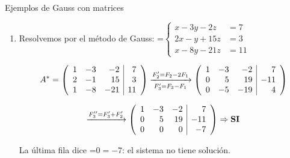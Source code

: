 \documentclass[11pt,a4paper]{article}
\newcommand{\fmm}[1]{\setbox0=\hbox{$#1$}\ifdim\wd0>\linewidth\fmdisp{#1}\else\mbox{\box0}\fi}
\newcommand{\fmdisp}[1]{\[\setbox2=\hbox{$\displaystyle #1$}\ifdim\wd2>\linewidth\resizebox{\linewidth}{!}{\box2}\else\box2\fi\]}
\begin{document}
\begin{fmex}{Ejemplos de Gauss con matrices}
\begin{enumerate}[label=\textbf{\arabic*.},leftmargin=*]
\fmdisp{\xrightarrow{F_3''=-2F_3'+F_2'}\left(\begin{array}{rrr|r}1 & -3 & 7 & 10\\ 0 & 14 & -34 & -42\\ 0 & 0 & 0 & 0\end{array}\right)\Rightarrow\textbf{SCI}}

Damos la solución general del sistema. Hacemos \fmm{z=\lambda} (y simplificamos la segunda fila entre 2):

\fmdisp{7y-17\lambda=-21\rightarrow y=\frac{17\lambda-21}{7}=-3+\frac{17}{7}\lambda}

\fmdisp{x-3y+7\lambda=10\rightarrow x=10+3\left(-3+\tfrac{17}{7}\lambda\right)-7\lambda=1+\frac{2}{7}\lambda}

\fmdisp{\boxed{x=1+\tfrac{2}{7}\lambda;\ \ y=-3+\tfrac{17}{7}\lambda;\ \ z=\lambda,\quad\lambda\in\mathbb{R}}}

También la podemos expresar así (cambiando \fmm{\lambda} por \fmm{7\lambda}): \fmm{x=1+2\lambda;\ y=-3+17\lambda;\ z=7\lambda,\ \lambda\in\mathbb{R}}
\item Resolvemos por el método de Gauss: \fmm{\left\{\begin{aligned}x-3y-2z&=7\\ 2x-y+15z&=3\\ x-8y-21z&=11\end{aligned}\right.}

\fmdisp{A^*=\left(\begin{array}{rrr|r}1 & -3 & -2 & 7\\ 2 & -1 & 15 & 3\\ 1 & -8 & -21 & 11\end{array}\right)\xrightarrow[F_3'=F_3-F_1]{F_2'=F_2-2F_1}\left(\begin{array}{rrr|r}1 & -3 & -2 & 7\\ 0 & 5 & 19 & -11\\ 0 & -5 & -19 & 4\end{array}\right)}

\fmdisp{\xrightarrow{F_3''=F_3'+F_2'}\left(\begin{array}{rrr|r}1 & -3 & -2 & 7\\ 0 & 5 & 19 & -11\\ 0 & 0 & 0 & -7\end{array}\right)\Rightarrow\textbf{SI}}

La última fila dice \fmm{0=-7}: el sistema no tiene solución.
\end{enumerate}
\end{fmex}
\end{document}
